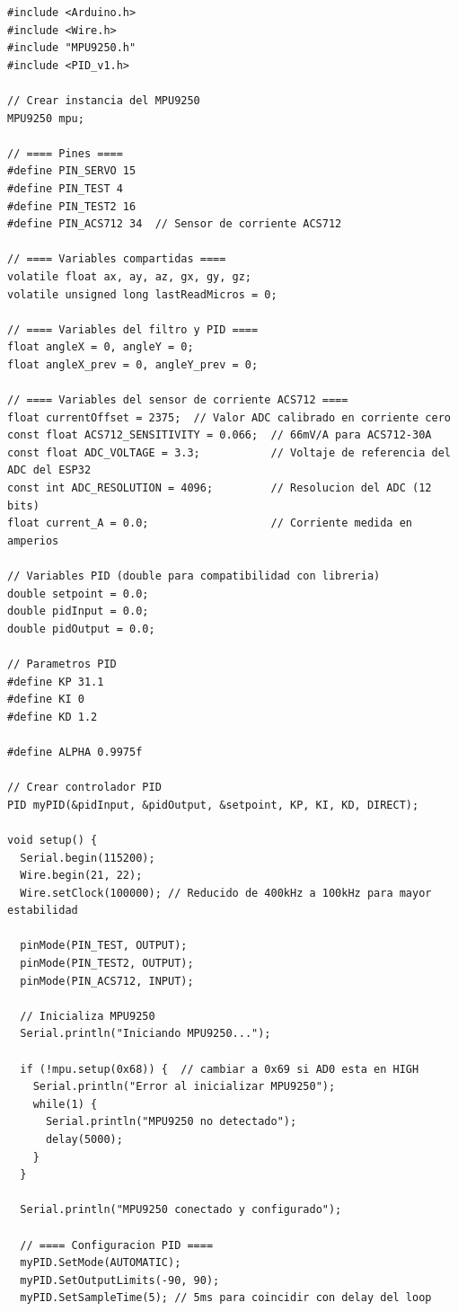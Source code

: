 \documentclass[12pt,letterpaper]{report}
\begin{document}
\begin{lstlisting}[style=arduino, caption={Código completo del sistema de control implementado en ESP32}, label={lst:esp32_control}]
#include <Arduino.h>
#include <Wire.h>
#include "MPU9250.h"
#include <PID_v1.h>

// Crear instancia del MPU9250
MPU9250 mpu;

// ==== Pines ====
#define PIN_SERVO 15
#define PIN_TEST 4
#define PIN_TEST2 16
#define PIN_ACS712 34  // Sensor de corriente ACS712

// ==== Variables compartidas ====
volatile float ax, ay, az, gx, gy, gz;
volatile unsigned long lastReadMicros = 0;

// ==== Variables del filtro y PID ====
float angleX = 0, angleY = 0;
float angleX_prev = 0, angleY_prev = 0;

// ==== Variables del sensor de corriente ACS712 ====
float currentOffset = 2375;  // Valor ADC calibrado en corriente cero
const float ACS712_SENSITIVITY = 0.066;  // 66mV/A para ACS712-30A
const float ADC_VOLTAGE = 3.3;           // Voltaje de referencia del ADC del ESP32
const int ADC_RESOLUTION = 4096;         // Resolucion del ADC (12 bits)
float current_A = 0.0;                   // Corriente medida en amperios

// Variables PID (double para compatibilidad con libreria)
double setpoint = 0.0;
double pidInput = 0.0;
double pidOutput = 0.0;

// Parametros PID
#define KP 31.1
#define KI 0
#define KD 1.2

#define ALPHA 0.9975f

// Crear controlador PID
PID myPID(&pidInput, &pidOutput, &setpoint, KP, KI, KD, DIRECT);

void setup() {
  Serial.begin(115200);
  Wire.begin(21, 22);
  Wire.setClock(100000); // Reducido de 400kHz a 100kHz para mayor estabilidad

  pinMode(PIN_TEST, OUTPUT);
  pinMode(PIN_TEST2, OUTPUT);
  pinMode(PIN_ACS712, INPUT);

  // Inicializa MPU9250
  Serial.println("Iniciando MPU9250...");
  
  if (!mpu.setup(0x68)) {  // cambiar a 0x69 si AD0 esta en HIGH
    Serial.println("Error al inicializar MPU9250");
    while(1) {
      Serial.println("MPU9250 no detectado");
      delay(5000);
    }
  }
  
  Serial.println("MPU9250 conectado y configurado");

  // ==== Configuracion PID ====
  myPID.SetMode(AUTOMATIC);
  myPID.SetOutputLimits(-90, 90);
  myPID.SetSampleTime(5); // 5ms para coincidir con delay del loop


\end{lstlisting}
\end{document}
